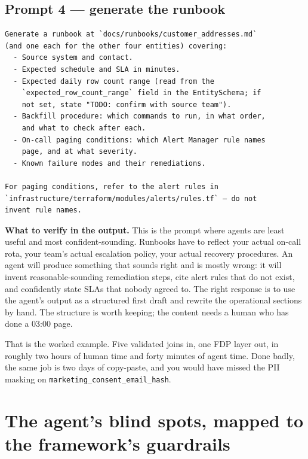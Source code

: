 \documentclass[
  11pt,
  british,
  oneside]{book}
\begin{document}
\hypertarget{prompt-4-generate-the-runbook}{%
\subsection{Prompt 4 --- generate the
runbook}\label{prompt-4-generate-the-runbook}}

\begin{verbatim}
Generate a runbook at `docs/runbooks/customer_addresses.md`
(and one each for the other four entities) covering:
  - Source system and contact.
  - Expected schedule and SLA in minutes.
  - Expected daily row count range (read from the
    `expected_row_count_range` field in the EntitySchema; if
    not set, state "TODO: confirm with source team").
  - Backfill procedure: which commands to run, in what order,
    and what to check after each.
  - On-call paging conditions: which Alert Manager rule names
    page, and at what severity.
  - Known failure modes and their remediations.

For paging conditions, refer to the alert rules in
`infrastructure/terraform/modules/alerts/rules.tf` — do not
invent rule names.
\end{verbatim}

\textbf{What to verify in the output.} This is the prompt where agents
are least useful and most confident-sounding. Runbooks have to reflect
your actual on-call rota, your team's actual escalation policy, your
actual recovery procedures. An agent will produce something that sounds
right and is mostly wrong: it will invent reasonable-sounding
remediation steps, cite alert rules that do not exist, and confidently
state SLAs that nobody agreed to. The right response is to use the
agent's output as a structured first draft and rewrite the operational
sections by hand. The structure is worth keeping; the content needs a
human who has done a 03:00 page.

That is the worked example. Five validated joins in, one FDP layer out,
in roughly two hours of human time and forty minutes of agent time. Done
badly, the same job is two days of copy-paste, and you would have missed
the PII masking on \texttt{marketing\_consent\_email\_hash}.

\hypertarget{the-agents-blind-spots-mapped-to-the-frameworks-guardrails}{%
\section{The agent's blind spots, mapped to the framework's
guardrails}\label{the-agents-blind-spots-mapped-to-the-frameworks-guardrails}}
\end{document}
